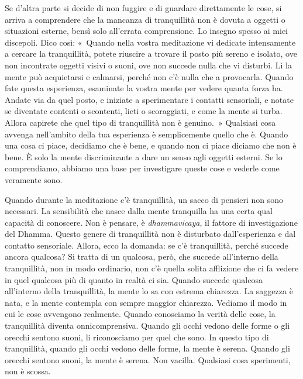 Se d'altra parte si decide di non fuggire e di guardare direttamente le
cose, si arriva a comprendere che la mancanza di tranquillità non è
dovuta a oggetti o situazioni esterne, bensì solo all'errata
comprensione. Lo insegno spesso ai miei discepoli. Dico così: «~Quando
nella vostra meditazione vi dedicate intensamente a cercare la
tranquillità, potete riuscire a trovare il posto più sereno e isolato,
ove non incontrate oggetti visivi o suoni, ove non succede nulla che vi
disturbi. Lì la mente può acquietarsi e calmarsi, perché non c'è nulla
che a provocarla. Quando fate questa esperienza, esaminate la vostra
mente per vedere quanta forza ha. Andate via da quel posto, e iniziate a
sperimentare i contatti sensoriali, e notate se diventate contenti o
scontenti, lieti o scoraggiati, e come la mente si turba. Allora
capirete che quel tipo di tranquillità non è genuino.~» Qualsiasi cosa
avvenga nell'ambito della tua esperienza è semplicemente quello che è.
Quando una cosa ci piace, decidiamo che è bene, e quando non ci piace
diciamo che non è bene. È solo la mente discriminante a dare un senso
agli oggetti esterni. Se lo comprendiamo, abbiamo una base per
investigare queste cose e vederle come veramente sono.

Quando durante la meditazione c'è tranquillità, un sacco di pensieri non
sono necessari. La sensibilità che nasce dalla mente tranquilla ha una
certa qual capacità di conoscere. Non è pensare, è \emph{dhammavicaya},
il fattore di investigazione del Dhamma. Questo genere di tranquillità
non è disturbato dall'esperienza e dal contatto sensoriale. Allora, ecco
la domanda: se c'è tranquillità, perché succede ancora qualcosa? Si
tratta di un qualcosa, però, che succede all'interno della
tranquillità, non in modo ordinario, non c'è quella solita afflizione
che ci fa vedere in quel qualcosa più di quanto in realtà ci sia. Quando
succede qualcosa all'interno della tranquillità, la mente lo sa con
estrema chiarezza. La saggezza è nata, e la mente contempla con sempre
maggior chiarezza. Vediamo il modo in cui le cose avvengono realmente.
Quando conosciamo la verità delle cose, la tranquillità diventa
onnicomprensiva. Quando gli occhi vedono delle forme o gli orecchi
sentono suoni, li riconosciamo per quel che sono. In questo tipo di
tranquillità, quando gli occhi vedono delle forme, la mente è serena.
Quando gli orecchi sentono suoni, la mente è serena. Non vacilla.
Qualsiasi cosa sperimenti, non è scossa.

